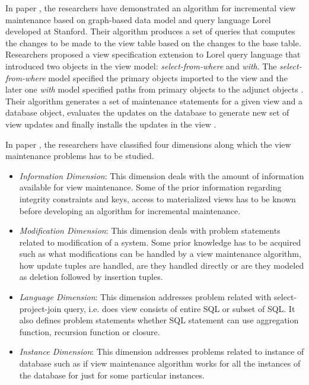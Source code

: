 \documentclass[11pt,a4paper,bibtotoc,idxtotoc,headsepline,footsepline,footexclude,BCOR12mm,DIV13]{scrbook}
\begin{document}
In paper \cite{incrementalmaintenance:materializedviews}, the researchers have demonstrated an algorithm for incremental view maintenance based on graph-based data model and query language Lorel developed at Stanford. Their algorithm produces a set of queries that computes the changes to be made to the view table based on the changes to the base table. Researchers proposed a view specification extension to Lorel query language \cite{incrementalmaintenance:materializedviews} that introduced two objects in the view model: \emph{select-from-where} and \emph{with}. The \emph{select-from-where} model specified the primary objects imported to the view and the later one \emph{with} model specified paths from primary objects to the adjunct objects \cite{incrementalmaintenance:materializedviews}. Their algorithm generates a set of maintenance statements for a given view and a database object, evaluates the updates on the database to generate new set of view updates and finally installs the updates in the view \cite{incrementalmaintenance:materializedviews}.

In paper \cite{maintenance:materializedviews}, the researchers have classified four dimensions along which the view maintenance problems has to be studied. 
\begin{itemize}
	\item \emph{Information Dimension}: This dimension deals with the amount of information available for view maintenance. Some of the prior information regarding integrity constraints and keys, access to materialized views has to be known before developing an algorithm for incremental maintenance.
	
	\item \emph{Modification Dimension}: This dimension deals with problem statements related to modification of a system. Some prior knowledge has to be acquired such as what modifications can be handled by a view maintenance algorithm, how update tuples are handled, are they handled directly or are they modeled as deletion followed by insertion tuples.
	
	\item \emph{Language Dimension}: This dimension addresses problem related with select-project-join query, i.e. does view consists of entire SQL or subset of SQL. It also defines problem statements whether SQL statement can use aggregation function, recursion function or closure. 
	
	\item \emph{Instance Dimension}: This dimension addresses problems related to instance of database such as if view maintenance algorithm works for all the instances of the database for just for some particular instances. 

\end{itemize}
\end{document}
